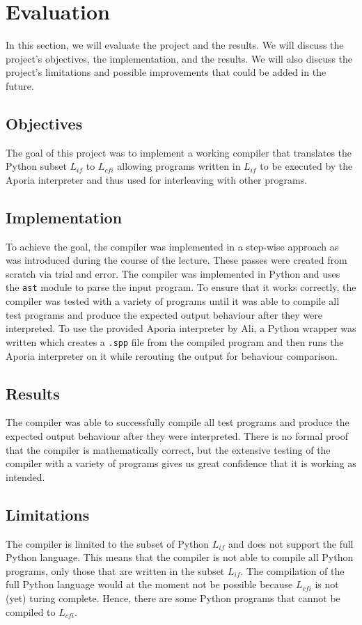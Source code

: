 \section{Evaluation}

In this section, we will evaluate the project and the results. We will discuss the project's objectives, the implementation, and the results. We will also discuss the project's limitations and possible improvements that could be added in the future.

\subsection{Objectives}
The goal of this project was to implement a working compiler that translates the Python subset $L_{if}$ to $L_{cfi}$ allowing programs written in $L_{if}$ to be executed by the Aporia interpreter and thus used for interleaving with other programs.

\subsection{Implementation}
To achieve the goal, the compiler was implemented in a step-wise approach as was introduced during the course of the lecture. These passes were created from scratch via trial and error. The compiler was implemented in Python and uses the \texttt{ast} module to parse the input program. To ensure that it works correctly, the compiler was tested with a variety of programs until it was able to compile all test programs and produce the expected output behaviour after they were interpreted.
To use the provided Aporia interpreter by Ali, a Python wrapper was written which creates a \texttt{.spp} file from the compiled program and then runs the Aporia interpreter on it while rerouting the output for behaviour comparison.

\subsection{Results}
The compiler was able to successfully compile all test programs and produce the expected output behaviour after they were interpreted. There is no formal proof that the compiler is mathematically correct, but the extensive testing of the compiler with a variety of programs gives us great confidence that it is working as intended.

\subsection{Limitations}
The compiler is limited to the subset of Python $L_{if}$ and does not support the full Python language. This means that the compiler is not able to compile all Python programs, only those that are written in the subset $L_{if}$.
The compilation of the full Python language would at the moment not be possible because $L_{cfi}$ is not (yet) turing complete. Hence, there are some Python programs that cannot be compiled to $L_{cfi}$.

